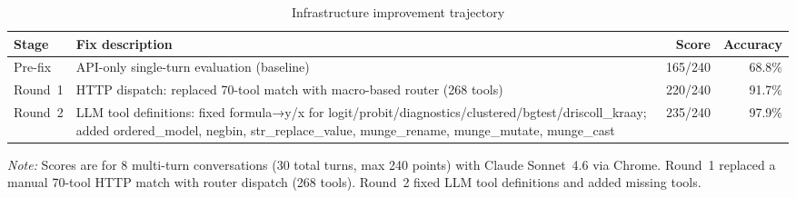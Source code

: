 \begin{table}[htbp]
\centering
\begin{threeparttable}
\caption{Infrastructure improvement trajectory}
\label{tab:e2e-improvement}
\small
\begin{tabular}{lp{6.5cm}rr}
\toprule
Stage & Fix description & Score & Accuracy \\
\midrule
Pre-fix & API-only single-turn evaluation (baseline) & 165/240 & 68.8\% \\
Round~1 & HTTP dispatch: replaced 70-tool match with macro-based router (268 tools) & 220/240 & 91.7\% \\
Round~2 & LLM tool definitions: fixed formula→y/x for logit/probit/diagnostics/clustered/bgtest/driscoll\_kraay; added ordered\_model, negbin, str\_replace\_value, munge\_rename, munge\_mutate, munge\_cast & 235/240 & 97.9\% \\
\bottomrule
\end{tabular}
\begin{tablenotes}[flushleft]
\item \emph{Note:} Scores are for 8 multi-turn conversations
(30 total turns, max 240 points) with Claude Sonnet~4.6 via Chrome.
Round~1 replaced a manual 70-tool HTTP match with router dispatch
(268 tools). Round~2 fixed LLM tool definitions and added missing tools.
\end{tablenotes}
\end{threeparttable}
\end{table}

